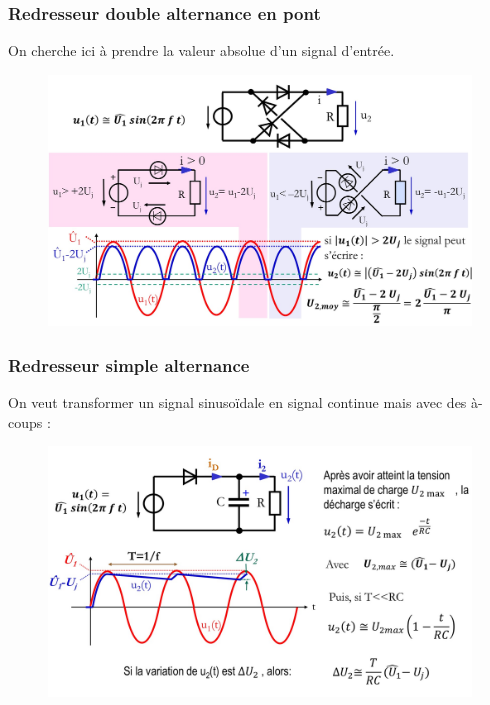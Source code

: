 \documentclass[../main.tex]{subfiles}
\begin{document}
\subsubsection{Redresseur double alternance en pont}
On cherche ici à prendre la valeur absolue d'un signal d'entrée.\\

\begin{figure}[hbt!]
    \centering
    \includegraphics[width=\textwidth]{IMAGES/elec/IMG_0126.jpeg}
\end{figure}

\subsubsection{Redresseur simple alternance}
On veut transformer un signal sinusoïdale en signal continue mais avec des à-coups : \\
\begin{figure}[hbt!]
    \centering
    \includegraphics[width=\textwidth]{IMAGES/elec/IMG_0127.jpeg}
\end{figure}
\end{document}

